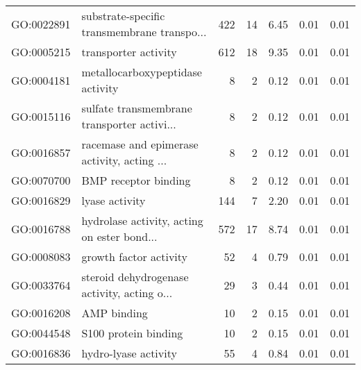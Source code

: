 \begin{table}[ht]
\begin{tabular}{llrrrrr}
  GO:0022891 & substrate-specific transmembrane transpo... & 422 &  14 & 6.45 & 0.01 & 0.01 \\ 
  GO:0005215 & transporter activity & 612 &  18 & 9.35 & 0.01 & 0.01 \\ 
  GO:0004181 & metallocarboxypeptidase activity &   8 &   2 & 0.12 & 0.01 & 0.01 \\ 
  GO:0015116 & sulfate transmembrane transporter activi... &   8 &   2 & 0.12 & 0.01 & 0.01 \\ 
  GO:0016857 & racemase and epimerase activity, acting ... &   8 &   2 & 0.12 & 0.01 & 0.01 \\ 
  GO:0070700 & BMP receptor binding &   8 &   2 & 0.12 & 0.01 & 0.01 \\ 
  GO:0016829 & lyase activity & 144 &   7 & 2.20 & 0.01 & 0.01 \\ 
  GO:0016788 & hydrolase activity, acting on ester bond... & 572 &  17 & 8.74 & 0.01 & 0.01 \\ 
  GO:0008083 & growth factor activity &  52 &   4 & 0.79 & 0.01 & 0.01 \\ 
  GO:0033764 & steroid dehydrogenase activity, acting o... &  29 &   3 & 0.44 & 0.01 & 0.01 \\ 
  GO:0016208 & AMP binding &  10 &   2 & 0.15 & 0.01 & 0.01 \\ 
  GO:0044548 & S100 protein binding &  10 &   2 & 0.15 & 0.01 & 0.01 \\ 
  GO:0016836 & hydro-lyase activity &  55 &   4 & 0.84 & 0.01 & 0.01 \\ 
   \hline
\end{tabular}
\end{table}
